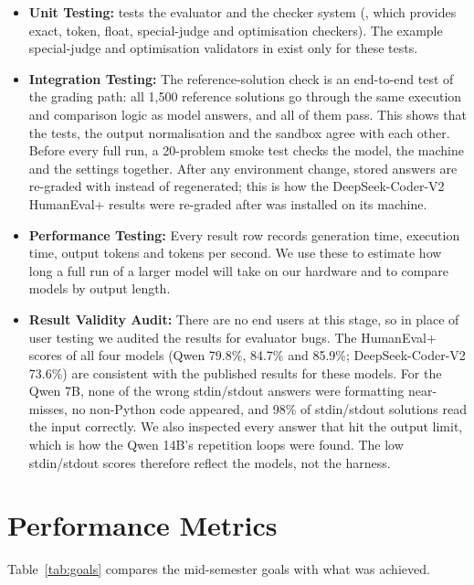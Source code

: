 \begin{itemize}[leftmargin=*]
  \item \textbf{Unit Testing:}  tests the evaluator and the checker system (, which provides exact, token, float, special-judge and optimisation checkers). The example special-judge and optimisation validators in  exist only for these tests.
  \item \textbf{Integration Testing:} The reference-solution check is an end-to-end test of the grading path: all 1,500 reference solutions go through the same execution and comparison logic as model answers, and all of them pass. This shows that the tests, the output normalisation and the sandbox agree with each other. Before every full run, a 20-problem smoke test checks the model, the machine and the settings together. After any environment change, stored answers are re-graded with  instead of regenerated; this is how the DeepSeek-Coder-V2 HumanEval+ results were re-graded after  was installed on its machine.
  \item \textbf{Performance Testing:} Every result row records generation time, execution time, output tokens and tokens per second. We use these to estimate how long a full run of a larger model will take on our hardware and to compare models by output length.
  \item \textbf{Result Validity Audit:} There are no end users at this stage, so in place of user testing we audited the results for evaluator bugs. The HumanEval+ scores of all four models (Qwen 79.8\%, 84.7\% and 85.9\%; DeepSeek-Coder-V2 73.6\%) are consistent with the published results for these models. For the Qwen 7B, none of the wrong stdin/stdout answers were formatting near-misses, no non-Python code appeared, and 98\% of stdin/stdout solutions read the input correctly. We also inspected every answer that hit the output limit, which is how the Qwen 14B's repetition loops were found. The low stdin/stdout scores therefore reflect the models, not the harness.
\end{itemize}

\section{Performance Metrics}

Table~\ref{tab:goals} compares the mid-semester goals with what was achieved.

